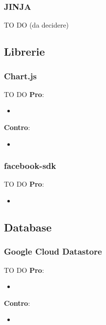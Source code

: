 		\subsubsection{JINJA} %
		\label{ssub:jinja}
		TO DO (da decidere)


	\subsection{Librerie} %
	\label{sub:librerie}
		\subsubsection{Chart.js} %
		\label{ssub:chartsjs}
		TO DO \newline
		\textbf{Pro}:
			\begin{itemize}
				\item
			\end{itemize}
		\noindent
		\newline
		\textbf{Contro}:
			\begin{itemize}
				\item
			\end{itemize}
			\noindent
		
		\subsubsection{facebook-sdk} %
		\label{ssub:facebook_sdk}
		TO DO \newline
		\textbf{Pro}:
			\begin{itemize}
				\item
			\end{itemize}
		\noindent
		\newline


	\subsection{Database} %
	\label{sub:database}

		\subsubsection{Google Cloud Datastore} %
		\label{ssub:datastore}
		TO DO \newline
		\textbf{Pro}:
			\begin{itemize}
				\item
			\end{itemize}
		\noindent
		\newline
		\textbf{Contro}:
			\begin{itemize}
				\item
			\end{itemize}
			\noindent



